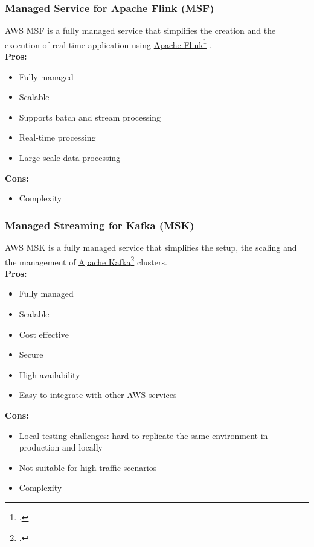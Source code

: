         \subsubsection{Managed Service for Apache Flink (MSF)}
        \label{aws:msf}
        AWS MSF is a fully managed service that simplifies the creation and the execution of real time application using \href{https://flink.apache.org/}{Apache Flink}\footcite{site:apache-flink} .\\
        \textbf{Pros:}
        \begin{itemize}
            \item Fully managed
            \item Scalable
            \item Supports batch and stream processing
            \item Real-time processing
            \item Large-scale data processing
        \end{itemize}
        \textbf{Cons:}
        \begin{itemize}
            \item Complexity
        \end{itemize}

        \subsubsection{Managed Streaming for Kafka (MSK)}
        \label{aws:msk}
        AWS MSK is a fully managed service that simplifies the setup, the scaling and the management of \href{https://kafka.apache.org/}{Apache Kafka}\footcite{site:apache-kafka} clusters.\\
        \textbf{Pros:}
        \begin{itemize}
            \item Fully managed
            \item Scalable
            \item Cost effective
            \item Secure
            \item High availability
            \item Easy to integrate with other AWS services
        \end{itemize}
        \textbf{Cons:}
        \begin{itemize}
            \item Local testing challenges: hard to replicate the same environment in production and locally
            \item Not suitable for high traffic scenarios
            \item Complexity
        \end{itemize}

